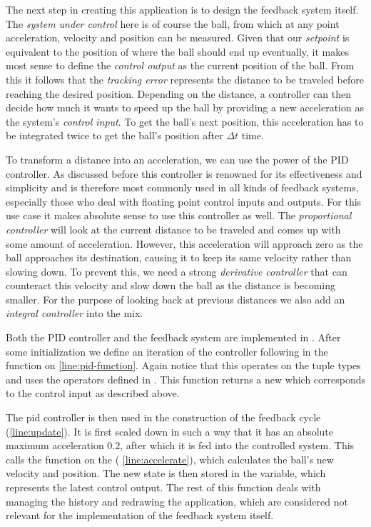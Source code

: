 The next step in creating this application is to design the feedback system itself. The \textit{system under control} here is of course the ball, from which at any point acceleration, velocity and position can be measured. Given that our \textit{setpoint} is equivalent to the position of where the ball should end up eventually, it makes most sense to define the \textit{control output} as the current position of the ball. From this it follows that the \textit{tracking error} represents the distance to be traveled before reaching the desired position. Depending on the distance, a controller can then decide how much it wants to speed up the ball by providing a new acceleration as the system's \textit{control input}. To get the ball's next position, this acceleration has to be integrated twice to get the ball's position after $\Delta t$ time.

To transform a distance into an acceleration, we can use the power of the PID controller. As discussed before this controller is renowned for its effectiveness and simplicity and is therefore most commonly used in all kinds of feedback systems, especially those who deal with floating point control inputs and outputs. For this use case it makes absolute sense to use this controller as well. The \textit{proportional controller} will look at the current distance to be traveled and comes up with some amount of acceleration. However, this acceleration will approach zero as the ball approaches its destination, causing it to keep its same velocity rather than slowing down. To prevent this, we need a strong \textit{derivative controller} that can counteract this velocity and slow down the ball as the distance is becoming smaller. For the purpose of looking back at previous distances we also add an \textit{integral controller} into the mix.

Both the PID controller and the feedback system are implemented in . After some initialization we define an iteration of the controller following  in the  function on \cref{line:pid-function}. Again notice that this operates on the tuple types and uses the operators defined in . This function returns a new  which corresponds to the control input as described above.

The pid controller is then used in the construction of the feedback cycle (\cref{line:update}). It is first scaled down in such a way that it has an absolute maximum acceleration $0.2$, after which it is fed into the controlled system. This calls the  function on the  ( \cref{line:accelerate}), which calculates the ball's new velocity and position. The new state is then stored in the  variable, which represents the latest control output. The rest of this function deals with managing the history and redrawing the application, which are considered not relevant for the implementation of the feedback system itself.

